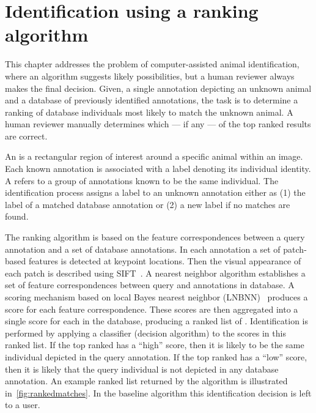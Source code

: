 \begin{comment}
    ./texfix.py --fpaths chapter3-matching.tex --outline --asmarkdown --numlines=999 -w
    ./texfix.py --fpaths chapter3-matching.tex --outline --asmarkdown --numlines=999 -w
    ./texfix.py --fpaths chapter3-matching.tex --reformat 
    # http://jaxedit.com/mark/
    fixtex --fpaths chapter3-matching.tex --outline --asmarkdown --numlines=999 --shortcite -w && ./checklang.py outline_chapter3-matching.md
\end{comment}

\chapter{Identification using a ranking algorithm}\label{chap:ranking}

    This chapter addresses the problem of computer-assisted animal identification, where an algorithm suggests
      likely possibilities, but a human reviewer always makes the final decision.
    Given, a single annotation depicting an unknown animal and a database of previously identified annotations,
      the task is to determine a ranking of database individuals most likely to match the unknown animal.
    A human reviewer manually determines which --- if any --- of the top ranked results are correct.

    An  is a rectangular region  of interest around a specific animal within an image. Each
    known annotation is associated with a \name{} label denoting its individual identity. A \glossterm{\name{}}
    refers to a group of annotations known to be the same individual. The identification process assigns a \name{}
    label to an unknown annotation either as (1) the \name{} label of a matched database annotation or (2) a new
    \name{} label if no matches are found.

    The ranking algorithm is based on the feature correspondences between a query annotation and a set of
      database annotations.
    In each annotation a set of patch-based features is detected at keypoint locations.
    Then the visual appearance of each patch is described using SIFT~\cite{lowe_distinctive_2004}.
    A nearest neighbor algorithm establishes a set of feature correspondences between query and annotations in
      database.
    A scoring mechanism based on local \naive{} Bayes nearest neighbor (LNBNN)~\cite{mccann_local_2012} produces
      a score for each feature correspondence.
    These scores are then aggregated into a single score for each \name{} in the database, producing a ranked
      list of \names{}.
    Identification is performed by applying a classifier (decision algorithm) to the scores in this ranked list.
    If the top ranked \name{} has a ``high'' score, then it is likely to be the same individual depicted in the
      query annotation.
    If the top ranked \name{} has a ``low'' score, then it is likely that the query individual is not depicted in
      any database annotation.
    An example ranked list returned by the algorithm is illustrated in~\cref{fig:rankedmatches}.
    In the baseline algorithm this identification decision is left to a user.

